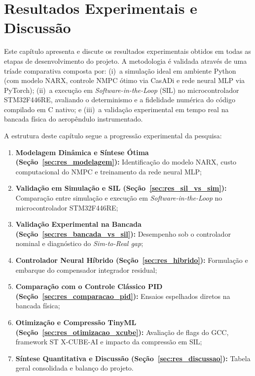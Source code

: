 \chapter{Resultados Experimentais e Discussão}
\label{cap:resultados}

Este capítulo apresenta e discute os resultados experimentais obtidos em todas as etapas de desenvolvimento do projeto. A metodologia é validada através de uma tríade comparativa composta por: (i)~a simulação ideal em ambiente Python (com modelo NARX, controle NMPC ótimo via CasADi e rede neural MLP via PyTorch); (ii)~a execução em \textit{Software-in-the-Loop} (SIL) no microcontrolador STM32F446RE, avaliando o determinismo e a fidelidade numérica do código compilado em C nativo; e (iii)~a validação experimental em tempo real na bancada física do aeropêndulo instrumentado.

A estrutura deste capítulo segue a progressão experimental da pesquisa:
\begin{enumerate}
    \item \textbf{Modelagem Dinâmica e Síntese Ótima (Seção~\ref{sec:res_modelagem}):} Identificação do modelo NARX, custo computacional do NMPC e treinamento da rede neural MLP;
    \item \textbf{Validação em Simulação e SIL (Seção~\ref{sec:res_sil_vs_sim}):} Comparação entre simulação e execução em \textit{Software-in-the-Loop} no microcontrolador STM32F446RE;
    \item \textbf{Validação Experimental na Bancada (Seção~\ref{sec:res_bancada_vs_sil}):} Desempenho sob o controlador nominal e diagnóstico do \textit{Sim-to-Real gap};
    \item \textbf{Controlador Neural Híbrido (Seção~\ref{sec:res_hibrido}):} Formulação e embarque do compensador integrador residual;
    \item \textbf{Comparação com o Controle Clássico PID (Seção~\ref{sec:res_comparacao_pid}):} Ensaios espelhados diretos na bancada física;
    \item \textbf{Otimização e Compressão TinyML (Seção~\ref{sec:res_otimizacao_xcube}):} Avaliação de flags do GCC, framework ST X-CUBE-AI e impacto da compressão em SIL;
    \item \textbf{Síntese Quantitativa e Discussão (Seção~\ref{sec:res_discussao}):} Tabela geral consolidada e balanço do projeto.
\end{enumerate}

